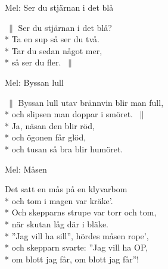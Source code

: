 \begin{SongText}
\begin{SongInfo}
    Mel: Ser du stjärnan i det blå
\end{SongInfo}
\begin{SongVerse}
    $\:\|$ Ser du stjärnan i det blå?\\*%
    Ta en sup så ser du två.\\*%
    Tar du sedan något mer,\\*%
    så ser du fler. $\:\|$
\end{SongVerse}
\end{SongText}
\begin{SongText}
\begin{SongInfo}
    Mel: Byssan lull
\end{SongInfo}
\begin{SongVerse}
    $\:\|$ Byssan lull utav brännvin blir man full,\\*%
    och slipsen man doppar i smöret. $\:\|$\\*%
    Ja, näsan den blir röd,\\*%
    och ögonen får glöd,\\*%
    och tusan så bra blir humöret.
\end{SongVerse}
\end{SongText}
\begin{SongText}[Måsen]
\begin{SongInfo}
    Mel: Måsen
\end{SongInfo}
\begin{SongVerse}
    Det satt en mås på en klyvarbom\\*%
    och tom i magen var kräke’.\\*%
    Och skepparns strupe var torr och tom,\\*%
    när skutan låg där i bläke.\\*%
    ”Jag vill ha sill”, hördes måsen rope’,\\*%
    och skepparn svarte: ”Jag vill ha OP,\\*%
    om blott jag får, om blott jag får”!
\end{SongVerse}
\end{SongText}
